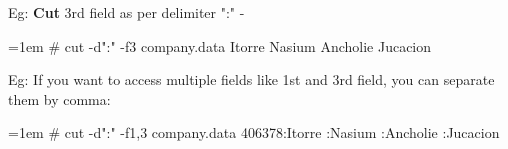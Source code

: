 \begin{flushleft}
\begin{itemize}
\begin{itemize}
\begin{tcolorbox}[breakable,notitle,boxrule=-0pt,colback=pink,colframe=pink]
		\end{tcolorbox}
		Eg: \textbf{Cut} 3rd field as per delimiter ":" -
		\bigskip
		\begin{tcolorbox}[breakable,notitle,boxrule=-0pt,colback=black,colframe=black]
			\color{green}
			\font=1em
			\# cut -d":" -f3 company.data
			\newline
			\color{white}
			Itorre
			\newline
			Nasium
			\newline
			Ancholie
			\newline
			Jucacion
			\font=4pt
		\end{tcolorbox}		
		Eg: If you want to access multiple fields like 1st and 3rd field, you can separate them by comma:
		\bigskip
		\begin{tcolorbox}[breakable,notitle,boxrule=-0pt,colback=black,colframe=black]
			\color{green}
			\font=1em
			\# cut -d":" -f1,3 company.data
			\newline
			\color{white}
			406378:Itorre
			:Nasium
			:Ancholie
			:Jucacion
			\font=4pt
		\end{tcolorbox}				 
	\end{itemize}

		
	\end{itemize}

\end{flushleft}

\newpage

